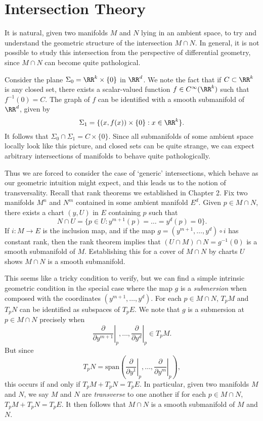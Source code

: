 \chapter{Intersection Theory}

It is natural, given two manifolds $M$ and $N$ lying in an ambient space, to try and understand the geometric structure of the intersection $M \cap N$. In general, it is not possible to study this intersection from the perspective of differential geometry, since $M \cap N$ can become quite pathological.

\begin{example}
    Consider the plane $\Sigma_0 = \RR^k \times \{ 0 \}$ in $\RR^d$. We note the fact that if $C \subset \RR^k$ is any closed set, there exists a scalar-valued function $f \in C^\infty(\RR^k)$ such that $f^{-1}(0) = C$. The graph of $f$ can be identified with a smooth submanifold of $\RR^d$, given by
    \[ \Sigma_1 = \{ (x,f(x)) \times \{ 0 \} : x \in \RR^k \}. \]
    It follows that $\Sigma_0 \cap \Sigma_1 = C \times \{ 0 \}$. Since all submanifolds of some ambient space locally look like this picture, and closed sets can be quite strange, we can expect arbitrary intersections of manifolds to behave quite pathologically.
\end{example}

Thus we are forced to consider the case of `generic' intersections, which behave as our geometric intuition might expect, and this leads us to the notion of transversality. Recall that rank theorems we established in Chapter 2. Fix two manifolds $M^n$ and $N^m$ contained in some ambient manifold $E^d$. Given $p \in M \cap N$, there exists a chart $(y,U)$ in $E$ containing $p$ such that
%
\[ N \cap U = \{ p \in U : y^{m+1}(p) = \dots = y^d(p) = 0 \}. \]
%
If $i: M \to E$ is the inclusion map, and if the map $g = (y^{m+1}, \dots, y^d) \circ i$ has constant rank, then the rank theorem implies that $(U \cap M) \cap N = g^{-1}(0)$ is a smooth submanifold of $M$. Establishing this for a cover of $M \cap N$ by charts $U$ shows $M \cap N$ is a smooth submanifold.

This seems like a tricky condition to verify, but we can find a simple intrinsic geometric condition in the special case where the map $g$ is a \emph{submersion} when composed with the coordinates $(y^{m+1}, \dots, y^d)$. For each $p \in M \cap N$, $T_p M$ and $T_p N$ can be identified as subspaces of $T_p E$. We note that $g$ is a submersion at $p \in M \cap N$ precisely when
%
\[ \left. \frac{\partial}{\partial y^{m+1}} \right|_p, \dots, \left. \frac{\partial}{\partial y^d} \right|_p \in T_p M. \]
%
But since
%
\[ T_p N = \text{span} \left( \left. \frac{\partial}{\partial y^1} \right|_p, \dots, \left. \frac{\partial}{\partial y^m} \right|_p \right), \]
%
this occurs if and only if $T_p M + T_p N = T_p E$. In particular, given two manifolds $M$ and $N$, we say $M$ and $N$ are \emph{transverse} to one another if for each $p \in M \cap N$, $T_p M + T_p N = T_p E$. It then follows that $M \cap N$ is a smooth submanifold of $M$ and $N$.

